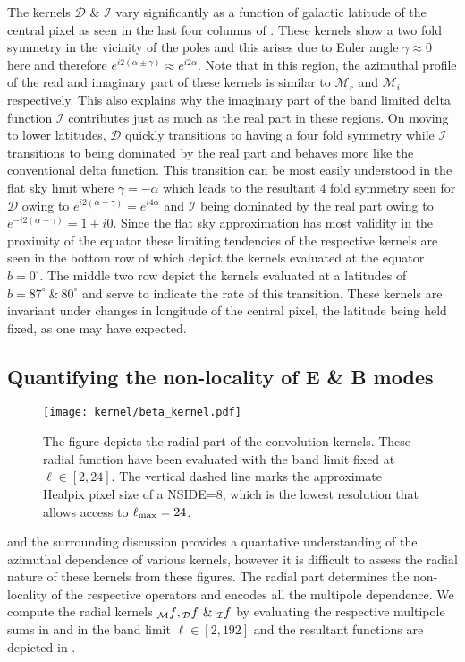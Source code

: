 The kernels $\mathcal{D}$ \& $\mathcal{I}$ vary significantly as a function of galactic latitude of the central pixel as seen in the last four columns of . These kernels show a two fold symmetry in the vicinity of the poles and this arises due to Euler angle $\gamma \approx 0$ here and therefore $e^{i2(\alpha \pm \gamma)} \approx e^{i2\alpha}$. Note that in this region, the azimuthal profile of the real and imaginary part of these kernels  is similar to $\mathcal{M}_r$ and $\mathcal{M}_i$ respectively.  This also explains why the imaginary part of the band limited delta function $\mathcal{I}$ contributes just as much as the real part in these regions. On moving to lower latitudes, $\mathcal{D}$ quickly transitions to having a four fold symmetry while $\mathcal{I}$ transitions to being dominated by the real part and behaves more like the conventional delta function. This transition can be most easily understood in the flat sky limit where $\gamma = -\alpha$ which leads to the resultant 4 fold symmetry seen for $\mathcal{D}$ owing to $e^{i2(\alpha - \gamma)} =e^{i4\alpha}$ and $\mathcal{I}$ being dominated by the real part owing to $e^{-i2(\alpha + \gamma)} =1 + i0$. Since the flat sky approximation has most validity in the proximity of the equator these limiting tendencies of the respective kernels are seen in the bottom row of  which depict the kernels evaluated at the equator $b=0^{\circ}$. The middle two row depict the kernels evaluated at a latitudes of $b=87^{\circ}~\&~ 80^{\circ}$ and serve to indicate the rate of this transition. These kernels are invariant under changes in longitude of the central pixel, the latitude being held fixed, as one may have expected.

\subsection{Quantifying the non-locality of E \& B modes} \label{sec:radial_locality}
%
\begin{figure}[!hbt]
\centering
\texttt{[image: kernel/beta\_kernel.pdf]}
\caption{The figure depicts the radial part of the convolution kernels. These radial function have been evaluated with the band limit fixed at $\ell \in [2,24]$. The vertical dashed line marks the approximate Healpix pixel size of a NSIDE=8, which is the lowest resolution that allows access to $\ell_{\rm max}=24$.}
\label{fig:beta_kernel}
\end{figure}
%
 and the surrounding discussion provides a quantative understanding of the  azimuthal dependence of various kernels, however it is difficult to assess the radial nature of these kernels from these figures. The radial part determines the non-locality of the respective operators and encodes all the multipole dependence. We compute the radial kernels ${_{\mathcal{M}}f}, {_{\mathcal{D}}f} ~\&~ {_{\mathcal{I}}f} $ by evaluating the respective multipole sums in  and  in the band limit $\ell \in [2,192]$ and the resultant functions are depicted in . 


